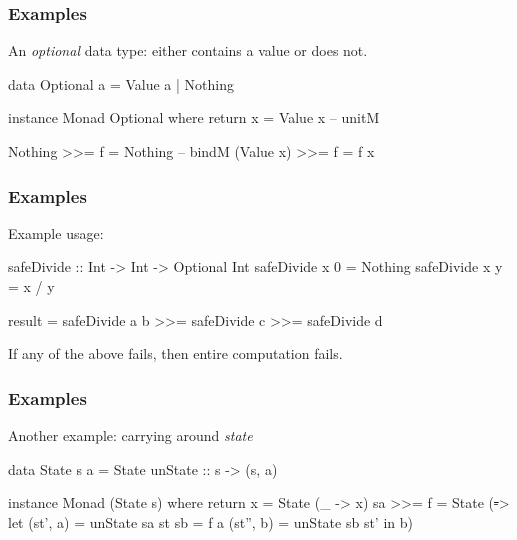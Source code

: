 \documentclass{beamer}
\begin{document}

\begin{frame}[fragile]
\frametitle{Examples}

An \emph{optional} data type: either contains a value or does not.

\begin{code}
data Optional a = Value a | Nothing

instance Monad Optional where
  return x = Value x        -- unitM

  Nothing   >>= f = Nothing -- bindM
  (Value x) >>= f = f x
\end{code}

\end{frame}


\begin{frame}[fragile]
\frametitle{Examples}

Example usage:

\begin{code}
safeDivide :: Int -> Int -> Optional Int
safeDivide x 0 = Nothing
safeDivide x y = x / y

result = safeDivide a b >>= safeDivide c
                        >>= safeDivide d
\end{code}

If any of the above fails, then entire computation fails.

\end{frame}


\begin{frame}[fragile]
\frametitle{Examples}

Another example: carrying around \emph{state}

\begin{code}
data State s a = State { unState :: s -> (s, a) }

instance Monad (State s) where
  return x = State (\_ -> x)
  sa >>= f = State (\st -> let (st', a)  = unState sa st
                               sb        = f a
                               (st'', b) = unState sb st'
                           in b)
\end{code}

\end{frame}
\end{document}
